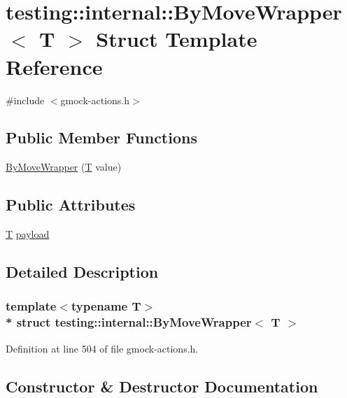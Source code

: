 \hypertarget{structtesting_1_1internal_1_1_by_move_wrapper}{}\section{testing\+:\+:internal\+:\+:By\+Move\+Wrapper$<$ T $>$ Struct Template Reference}
\label{structtesting_1_1internal_1_1_by_move_wrapper}


{\ttfamily \#include $<$gmock-\/actions.\+h$>$}

\subsection*{Public Member Functions}
\begin{DoxyCompactItemize}
\item 
\hyperlink{structtesting_1_1internal_1_1_by_move_wrapper_a60df33395785e0bfc5f72fba32376349}{By\+Move\+Wrapper} (\hyperlink{functions__7_8js_adf1f3edb9115acb0a1e04209b7a9937b}{T} value)
\end{DoxyCompactItemize}
\subsection*{Public Attributes}
\begin{DoxyCompactItemize}
\item 
\hyperlink{functions__7_8js_adf1f3edb9115acb0a1e04209b7a9937b}{T} \hyperlink{structtesting_1_1internal_1_1_by_move_wrapper_ae8407b1ae99db3f00797d68b9ee9e870}{payload}
\end{DoxyCompactItemize}


\subsection{Detailed Description}
\subsubsection*{template$<$typename T$>$\\*
struct testing\+::internal\+::\+By\+Move\+Wrapper$<$ T $>$}



Definition at line 504 of file gmock-\/actions.\+h.



\subsection{Constructor \& Destructor Documentation}
